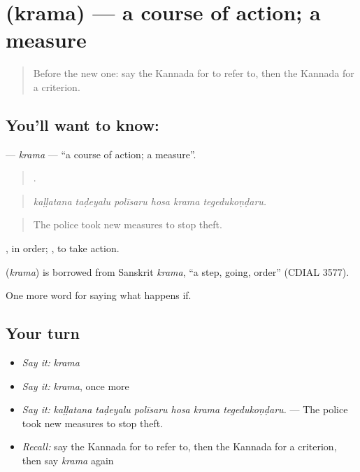 \section[\texorpdfstring{\kn{ಕ್ರಮ} (krama)}{ಕ್ರಮ (krama)}]{ (krama) — a course of action; a measure}

\label{lesson:KA-C422-krama}



\begin{quote}
Before the new one: say the Kannada for to refer to, then the Kannada for a criterion.
\end{quote}

\subsection*{You'll want to know: }
\textbf{} — \emph{krama} — \textquotedblleft{}a course of action; a measure\textquotedblright{}.

\begin{quote}
     .
\end{quote}

\begin{quote}
\emph{kaḷḷatana taḍeyalu polīsaru hosa krama tegedukoṇḍaru.}
\end{quote}

\begin{quote}
The police took new measures to stop theft.
\end{quote}

, in order;  , to take action.

\begin{cousinweb}
\textbf{} (\emph{krama}) is borrowed from Sanskrit \emph{krama}, \textquotedblleft{}a step, going, order\textquotedblright{} (CDIAL 3577).
\end{cousinweb}

\begin{grammarlens}[title={What you've built}]
One more word for saying what happens if.
\end{grammarlens}

\subsection*{Your turn}
\begin{itemize}
\raggedright
  \item \emph{Say it:} \emph{krama}
  \item \emph{Say it:} \emph{krama}, once more
  \item \emph{Say it:} \emph{kaḷḷatana taḍeyalu polīsaru hosa krama tegedukoṇḍaru.} — The police took new measures to stop theft.
  \item \emph{Recall:} say the Kannada for to refer to, then the Kannada for a criterion, then say \emph{krama} again
\end{itemize}

